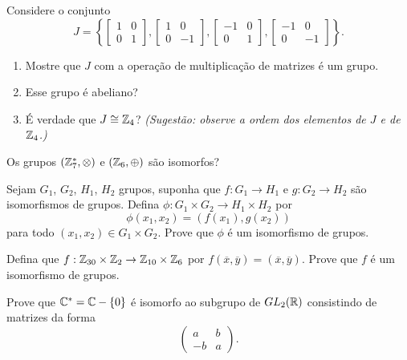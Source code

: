 \documentclass[12pt]{exam}
\begin{document}
    \questao{} Considere o conjunto
    \[
      J = \left\{\begin{bmatrix}
        1 & 0\\0 & 1
      \end{bmatrix}, \begin{bmatrix}
        1 & 0\\0 & -1
      \end{bmatrix}, \begin{bmatrix}
        -1 & 0\\0 & 1
      \end{bmatrix}, \begin{bmatrix}
        -1 & 0\\0 & -1
      \end{bmatrix}\right\}.
    \]
    \begin{enumerate}[label=({\alph*})]
      \item Mostre que $J$ com a opera\c{c}\~ao de multiplica\c{c}\~ao de matrizes \'e um grupo.

      \item Esse grupo \'e abeliano?

      \item É verdade que $J \cong \mathbb{Z}_4$? \textit{(Sugestão: observe a ordem dos elementos de $J$ e de $\mathbb{Z}_4$.)}
    \end{enumerate}

    \vspace{.3cm}

    \questao{} Os grupos $(\mathbb{Z}_7^*, \otimes)$ e $(\mathbb{Z}_6, \oplus)$ s\~ao isomorfos?

    \vspace{.3cm}

    \questao{} Sejam $G_1$, $G_2$, $H_1$, $H_2$ grupos, suponha que $f : G_1 \to H_1$ e $g : G_2 \to H_2$ são isomorfismos de grupos. Defina $\phi : G_1 \times G_2 \to H_1 \times H_2$ por
    \[
        \phi(x_1, x_2) = (f(x_1), g(x_2))
    \]
    para todo $(x_1, x_2) \in G_1 \times G_2$. Prove que $\phi$ é um isomorfismo de grupos.

    \vspace{.3cm}

    \questao{} Defina que $f : \mathbb{Z}_{30} \times \mathbb{Z}_2 \to \mathbb{Z}_{10} \times \mathbb{Z}_6$ por $f(\overline{x}, \overline{y}) = (\overline{x}, \overline{y})$. Prove que $f$ é um isomorfismo de grupos.

    \vspace{.3cm}

    \questao{} Prove que $\mathbb{C}^* = \mathbb{C} - \{0\}$ é isomorfo ao subgrupo de $GL_2(\mathbb{R})$ consistindo de matrizes da forma
    \[
        \begin{pmatrix}
            a & b\\
            -b & a
        \end{pmatrix}.
    \]
\end{document}
